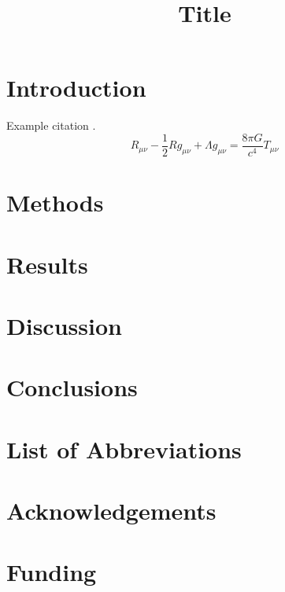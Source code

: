 \documentclass{definitions/vnuhcmj}
\title{Title}
\begin{document}
    \pagestyle{PageStyle}
    \thispagestyle{FirstPageStyle}

    \MakeSideBar
    \MakeAbstract

    \section{Introduction}
    \lipsum[1-5]
    \vspace{12pt}
    \par
    Example citation \supercite{article-example}.
    \[
        R_{\mu\nu} - \frac{1}{2} R g_{\mu\nu}
        + \Lambda g_{\mu\nu}
        = \frac{8\pi G}{c^4} T_{\mu\nu}
    \]

    \section{Methods}

    \section{Results}

    \section{Discussion}

    \section{Conclusions}

    \section*{List of Abbreviations}

    \section*{Acknowledgements}

    \section*{Funding}
\end{document}
